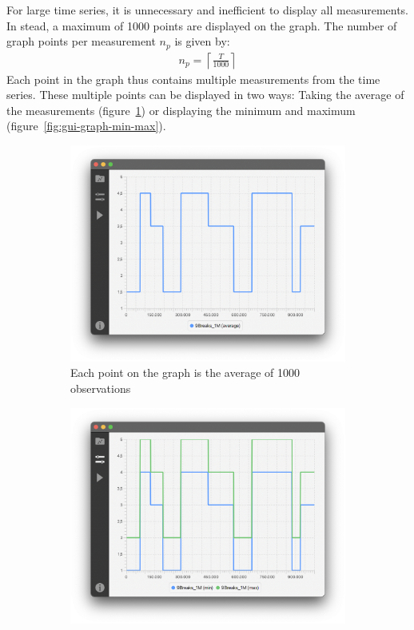 For large time series, it is unnecessary and inefficient to display all
measurements. In stead, a maximum of 1000 points are displayed on the graph. The number of
graph points per measurement $n_p$ is given by:
\begin{align}
    n_p = \left\lceil \frac{T}{1000} \right\rceil
\end{align}
Each point in the graph thus contains multiple measurements from the time
series. These multiple points can be displayed in two ways: Taking the average
of the measurements (figure~\ref{fig:gui-graph-avg}) or displaying the minimum
and maximum (figure~\ref{fig:gui-graph-min-max}). 

\begin{figure}[ht]
    \centering
    \begin{subfigure}[b]{.48\textwidth}
        \centering
        \includegraphics[width=\textwidth]{fig/gui-graph-avg.png}
        \caption{Each point on the graph is the average of 1000 observations}
        \label{fig:gui-graph-avg}
    \end{subfigure}
    \hfill
    \begin{subfigure}[b]{.48\textwidth}
        \centering
        \includegraphics[width=\textwidth]{fig/gui-graph-min-max.png}

\end{subfigure}
\end{figure}
